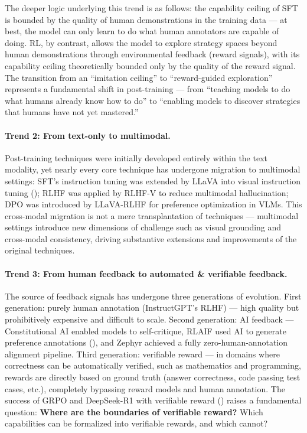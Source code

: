 \noindent
The deeper logic underlying this trend is as follows:
the capability ceiling of SFT is bounded by the quality of human demonstrations in the training data ---
at best, the model can only learn to do what human annotators are capable of doing.
RL, by contrast, allows the model to explore strategy spaces beyond human demonstrations through environmental feedback (reward signals),
with its capability ceiling theoretically bounded only by the quality of the reward signal.
The transition from an ``imitation ceiling'' to ``reward-guided exploration''
represents a fundamental shift in post-training --- from ``teaching models to do what humans already know how to do''
to ``enabling models to discover strategies that humans have not yet mastered.''

\paragraph{Trend 2: From text-only to multimodal.}
Post-training techniques were initially developed entirely within the text modality,
yet nearly every core technique has undergone migration to multimodal settings:
SFT's instruction tuning was extended by LLaVA \cite{liu2023llava} into
visual instruction tuning ();
RLHF was applied by RLHF-V \cite{sun2023rlhfv} to reduce multimodal hallucination;
DPO was introduced by LLaVA-RLHF \cite{sun2024llava-rlhf} for preference optimization in VLMs.
This cross-modal migration is not a mere transplantation of techniques ---
multimodal settings introduce new dimensions of challenge such as visual grounding
and cross-modal consistency,
driving substantive extensions and improvements of the original techniques.

\paragraph{Trend 3: From human feedback to automated \& verifiable feedback.}
The source of feedback signals has undergone three generations of evolution.
First generation: purely human annotation (InstructGPT's RLHF) ---
high quality but prohibitively expensive and difficult to scale.
Second generation: AI feedback ---
Constitutional AI \cite{bai2022constitutional} enabled models to self-critique,
RLAIF \cite{lee2023rlaif} used AI to generate preference annotations
(),
and Zephyr \cite{tunstall2023zephyr} achieved a fully zero-human-annotation alignment pipeline.
Third generation: verifiable reward ---
in domains where correctness can be automatically verified, such as mathematics and programming,
rewards are directly based on ground truth (answer correctness, code passing test cases, etc.),
completely bypassing reward models and human annotation.
The success of GRPO \cite{shao2024grpo} and DeepSeek-R1 \cite{deepseek2025r1}
with verifiable reward ()
raises a fundamental question:
\textbf{Where are the boundaries of verifiable reward?}
Which capabilities can be formalized into verifiable rewards, and which cannot?

